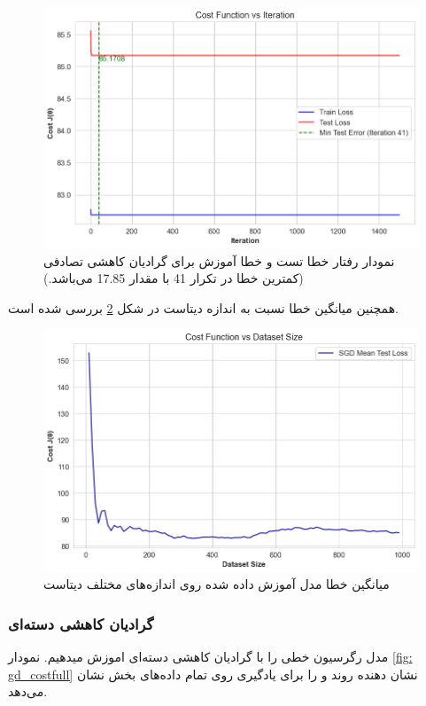 \documentclass{article}
\begin{document}
	\begin{figure}[H]
		\centering
		\includegraphics[scale=0.5]{figs/sgd_costvsiter_2reg}
		\caption{نمودار رفتار خطا تست و خطا آموزش برای گرادیان کاهشی تصادفی (کمترین خطا در تکرار 41 با مقدار 17.85 می‌باشد.)}
		\label{fig: sgd_costfull}
	\end{figure}
	همچنین میانگین خطا نسبت به اندازه دیتاست در شکل 
	\ref{fig: sgd datasize}
	بررسی شده است.
	\begin{figure}[H]
		\centering
		\includegraphics[scale=0.5]{figs/sgd_mean_test_error}
		\caption{میانگین خطا مدل آموزش داده شده روی اندازه‌های مختلف دیتاست}
		\label{fig: sgd datasize}
	\end{figure}
	\subsubsection{گرادیان کاهشی دسته‌ای}
	مدل رگرسیون خطی را با گرادیان کاهشی دسته‌ای اموزش میدهیم. نمودار
	\ref{fig: gd_costfull}
	نشان دهنده روند 
	و
	را برای یادگیری روی تمام داده‌های بخش
	نشان می‌دهد.
	
\end{document}
